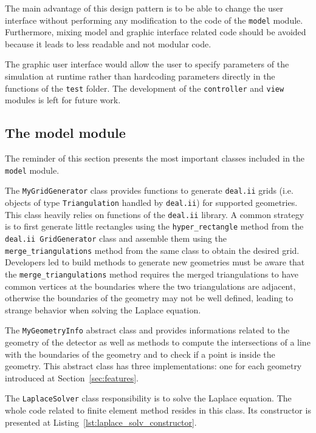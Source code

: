 \documentclass[11pt]{article}
\begin{document}
		The main advantage of this design pattern is to be able to change the user interface without
		performing any modification to the code of the \texttt{model} module. Furthermore,
		mixing model and graphic interface related code should be avoided because it leads to
		less readable and not modular code.

		The graphic user interface would allow the user to specify
		parameters of the simulation at runtime rather than hardcoding parameters
		directly in the functions of the \texttt{test} folder.
		The development of the \texttt{controller} and \texttt{view} modules
		is left for future work.

	\subsection{The model module}

		The reminder of this section presents the most important classes
		included in the \texttt{model} module.



		The \texttt{MyGridGenerator} class provides functions to generate \texttt{deal.ii}
		grids (i.e. objects of type \texttt{Triangulation} handled by \texttt{deal.ii}) for supported
		geometries. This class heavily relies on functions of the \texttt{deal.ii}
		library. A common strategy is to first generate
		little rectangles using the \lstinline{hyper_rectangle} method from the
		\texttt{deal.ii GridGenerator} class and assemble them using the \lstinline{merge_triangulations}
		method from the same class to obtain the desired grid. Developers led to build
		methods to generate
		new geometries must be aware that the \lstinline{merge_triangulations} method
		requires the merged triangulations to have common vertices at the boundaries
		where the two triangulations are adjacent, otherwise
		the boundaries of the geometry may not be well defined, leading to strange behavior
		when solving the Laplace equation.

		The \texttt{MyGeometryInfo} abstract class and provides informations
		related to the
		geometry of the detector as well as methods to compute the intersections of a
		line with the boundaries of the geometry and to check if a point is inside
		the geometry. This abstract class has three implementations: one for each
		geometry introduced at Section~\ref{sec:features}.

		The \texttt{LaplaceSolver} class responsibility is to solve the Laplace equation.
		The whole code related to finite element method resides in this class.
		Its constructor is presented at Listing~\ref{lst:laplace_solv_constructor}.
		\newline
\end{document}
